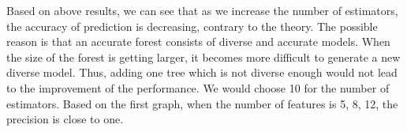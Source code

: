 \documentclass[12pt]{article}
\begin{document}
\begin{figure}[H]
\centering
{}
\end{figure}
Based on above results, we can see that as we increase the number of estimators, the accuracy of prediction is decreasing, contrary to the theory. The possible reason is that an accurate forest consists of diverse and accurate models. When the size of the forest is getting larger, it  becomes more difficult to generate a new diverse model. Thus, adding one tree which is not diverse enough would not lead to the improvement of the performance. We would choose 10 for the number of estimators. Based on the first graph, when the number of features is 5, 8, 12, the precision is close to one.  
\end{document}

